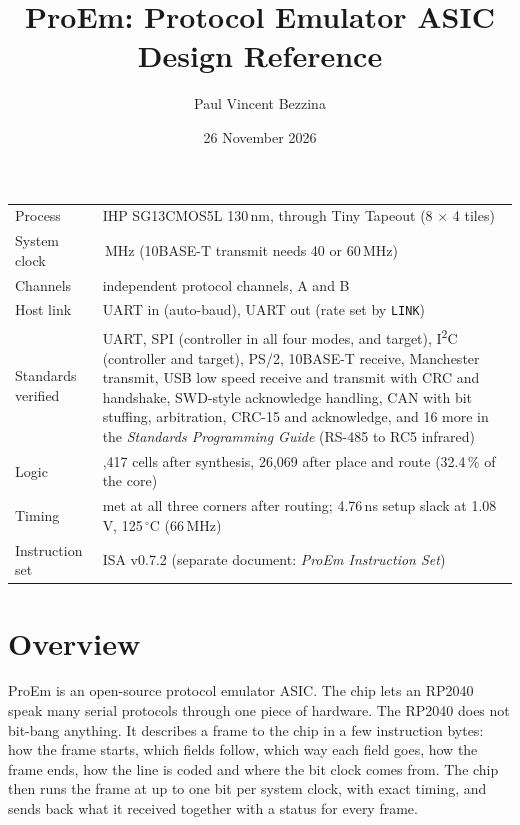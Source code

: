 \documentclass[11pt,a4paper]{article}
\title{ProEm: Protocol Emulator ASIC\\\large Design Reference}
\author{Paul Vincent Bezzina}
\date{26 November 2026}
\newcommand{\sig}[1]{\texttt{#1}}
\begin{document}
\maketitle
\thispagestyle{fancy}

\begin{center}
\begin{tabularx}{\linewidth}{@{}l>{\raggedright\arraybackslash}X@{}}
\toprule
Process & IHP SG13CMOS5L 130\,nm, through Tiny Tapeout (8 $\times$ 4 tiles) \\
System clock & 50\,MHz (10BASE-T transmit needs 40 or 60\,MHz) \\
Channels & 2 independent protocol channels, A and B \\
Host link & UART in (auto-baud), UART out (rate set by \sig{LINK}) \\
Standards verified & UART, SPI (controller in all four modes, and target), I\textsuperscript{2}C (controller and target), PS/2, 10BASE-T receive, Manchester transmit, USB low speed receive and transmit with CRC and handshake, SWD-style acknowledge handling, CAN with bit stuffing, arbitration, CRC-15 and acknowledge, and 16 more in the \emph{Standards Programming Guide} (RS-485 to RC5 infrared) \\
Logic & 19,417 cells after synthesis, 26,069 after place and route (32.4\,\% of the core) \\
Timing & met at all three corners after routing; 4.76\,ns setup slack at 1.08\,V, 125\,$^\circ$C (66\,MHz) \\
Instruction set & ISA v0.7.2 (separate document: \emph{ProEm Instruction Set}) \\
\bottomrule
\end{tabularx}
\end{center}

\tableofcontents
\newpage

\section{Overview}

ProEm is an open-source protocol emulator ASIC. The chip lets an RP2040 speak many serial protocols through one piece of hardware. The RP2040 does not bit-bang anything. It describes a frame to the chip in a few instruction bytes: how the frame starts, which fields follow, which way each field goes, how the frame ends, how the line is coded and where the bit clock comes from. The chip then runs the frame at up to one bit per system clock, with exact timing, and sends back what it received together with a status for every frame.
\end{document}
